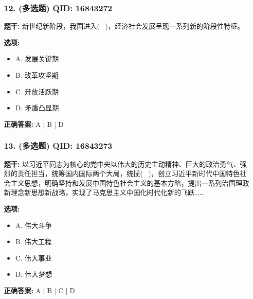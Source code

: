 \documentclass[12pt,UTF8]{ctexart}
\begin{document}
\subsubsection*{12. (多选题) \small QID: 16843272}

\textbf{题干:}
新世纪新阶段，我国进入(  )，经济社会发展呈现一系列新的阶段性特征。

\textbf{选项:}
\begin{itemize}[leftmargin=*]

  \item A. 发展关键期

  \item B. 改革攻坚期

  \item C. 开放活跃期

  \item D. 矛盾凸显期

\end{itemize}

\textbf{正确答案:}
A | B | D

\vspace{0.3em}\hrulefill\vspace{0.7em}

\subsubsection*{13. (多选题) \small QID: 16843273}

\textbf{题干:}
以习近平同志为核心的党中央以伟大的历史主动精神、巨大的政治勇气、强烈的责任担当，统筹国内国际两个大局，统揽(  )，创立习近平新时代中国特色社会主义思想，明确坚持和发展中国特色社会主义的基本方略，提出一系列治国理政新理念新思想新战略，实现了马克思主义中国化时代化新的飞跃……

\textbf{选项:}
\begin{itemize}[leftmargin=*]

  \item A. 伟大斗争

  \item B. 伟大工程

  \item C. 伟大事业

  \item D. 伟大梦想

\end{itemize}

\textbf{正确答案:}
A | B | C | D

\vspace{0.3em}\hrulefill\vspace{0.7em}
\end{document}
